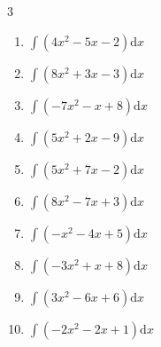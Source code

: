 \begin{multicols}{3}
\begin{enumerate}

\columnbreak %

  \item $\displaystyle \int \left( 4x^{2}-5x-2 \right) \mathrm{d}x$


  \item $\displaystyle \int \left( 8x^{2}+3x-3 \right) \mathrm{d}x$


  \item $\displaystyle \int \left( -7x^{2}-x+8 \right) \mathrm{d}x$


  \item $\displaystyle \int \left( 5x^{2}+2x-9 \right) \mathrm{d}x$


  \item $\displaystyle \int \left( 5x^{2}+7x-2 \right) \mathrm{d}x$


  \item $\displaystyle \int \left( 8x^{2}-7x+3 \right) \mathrm{d}x$


  \item $\displaystyle \int \left( -x^{2}-4x+5 \right) \mathrm{d}x$


  \item $\displaystyle \int \left( -3x^{2}+x+8 \right) \mathrm{d}x$


  \item $\displaystyle \int \left( 3x^{2}-6x+6 \right) \mathrm{d}x$


  \item $\displaystyle \int \left( -2x^{2}-2x+1 \right) \mathrm{d}x$


\end{enumerate}
\end{multicols}
